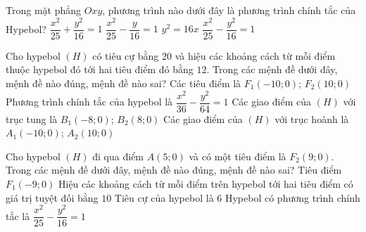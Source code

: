 

\begin{ex}%
	Trong mặt phẳng $Oxy$, phương trình nào dưới đây là phương trình chính tắc của Hypebol? 
	\choice 
		 {$\dfrac{x^2}{25}+\dfrac{y^2}{16}=1$}
		{$\dfrac{x^2}{25}-\dfrac{y}{16}=1$} 
		 {$y^2=16x$}
		{\True $\dfrac{x^2}{25}-\dfrac{y^2}{16}=1$} 
\end{ex}



\begin{ex}%
	Cho hypebol $(H)$ có tiêu cự bằng $20$ và hiệu các khoảng cách từ mỗi điểm thuộc hypebol đó tới hai tiêu điểm  đó bằng $12$. Trong các mệnh đề dưới đây, mệnh đề nào đúng, mệnh đề nào sai?
	\choiceTF 
		{Các tiêu điểm là $F_1(-10;0)$; $F_2(10;0)$} 
		{\True Phương trình chính tắc của hypebol là  $\dfrac{x^2}{36}-\dfrac{y^2}{64}=1$}
		{Các  giao điểm của $(H)$ với trục tung là $B_1(-8;0)$; $B_2(8;0)$}
		{\True Các giao điểm của $(H)$ với trục hoành là  $A_1(-10;0)$; $A_2(10;0)$}
\end{ex}

\begin{ex}%
	Cho hypebol $(H)$ đi qua điểm $A(5;0)$ và  có một tiêu điểm là $F_2(9;0)$. Trong các mệnh đề dưới đây, mệnh đề nào đúng, mệnh đề nào sai?
	\choiceTF 
		 {\True Tiêu điểm $F_1(-9;0)$}
		{\True Hiệu các khoảng cách từ mỗi điểm trên hypebol tới hai tiêu  điểm có giá trị tuyệt đối bằng $10$}
		{Tiêu cự của hypebol  là $6$}
		{Hypebol có phương trình chính tắc là $\dfrac{x^2}{25}-\dfrac{y^2}{16}=1$} 
\end{ex}

